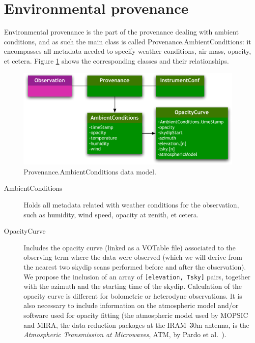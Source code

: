 	
	\section{Environmental provenance} %
	\label{sec:environmental_provenance}
		
		Environmental provenance is the part of the provenance
		dealing with ambient conditions, and as such the main class
		is called Provenance.AmbientConditions: it encompasses all
		metadata needed to specify weather conditions, air mass, 
		opacity, et cetera. Figure
		\ref{figProvenanceAmbient} shows the corresponding classes and
		their relationships.

		\begin{figure}[tbp]
		\begin{center}
		\includegraphics[width=\columnwidth]
			{fig/Provenance-AmbientConditions-DM}
		\end{center}
		\caption[Provenance.AmbientConditions data model]
			{Provenance.AmbientConditions data model.}
		\label{figProvenanceAmbient}
		\end{figure}
		
		
		\begin{description}
			\item[AmbientConditions] Holds all metadata related
			with weather conditions for the observation, such as
			humidity, wind speed, opacity at zenith, et cetera.
			
			 \item[OpacityCurve] Includes the opacity curve (linked
			as a VOTable file) associated to the observing term
			where the data were observed (which we will derive from
			the nearest two skydip scans performed before and after
			the observation). We propose the inclusion of an array
			of \texttt{[elevation, Tsky]} pairs, together with the
			azimuth and the starting time of the skydip.
			Calculation of the opacity curve is different for
			bolometric or heterodyne observations. It is also
			necessary to include information on the atmospheric
			model and/or software used for opacity fitting (the
			atmospheric model used by MOPSIC and MIRA,
			the data reduction packages at the IRAM~30m antenna,
			is the \emph{Atmospheric Transmission at Microwaves},
			ATM, by Pardo et al.~\cite{ParCerSer01Atmospheric}).
		\end{description}
		

